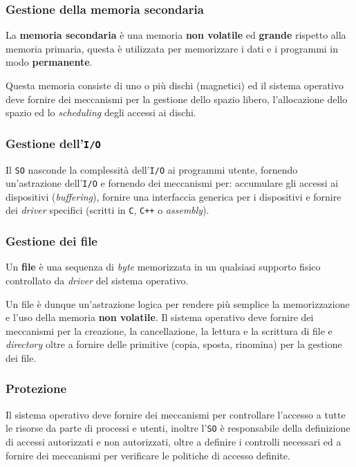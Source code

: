     \subsubsection{Gestione della memoria secondaria}
        \begin{definition}
            La \textbf{memoria secondaria} è una memoria \textbf{non volatile} ed \textbf{grande} rispetto alla memoria primaria, questa è utilizzata per memorizzare i dati e i programmi in modo \textbf{permanente}.
        \end{definition}
        Questa memoria consiste di uno o più dischi (magnetici) ed il sistema operativo deve fornire dei meccanismi per la gestione dello spazio libero, l'allocazione dello spazio ed lo \textit{scheduling} degli accessi ai dischi.

    \subsubsection{Gestione dell'\texttt{I/O}}
        Il \texttt{SO} nasconde la complessità dell'\texttt{I/O} ai programmi utente, fornendo un'astrazione dell'\texttt{I/O} e fornendo dei meccanismi per: accumulare gli accessi ai dispositivi (\textit{buffering}), fornire una interfaccia generica per i dispositivi e fornire dei \textit{driver} specifici (scritti in \texttt{C}, \texttt{C++} o \textit{assembly}). 

    \subsubsection{Gestione dei file}
        \begin{definition}[File]
            Un \textbf{file} è una sequenza di \textit{byte} memorizzata in un qualsiasi supporto fisico controllato da \textit{driver} del sistema operativo.
        \end{definition}
        Un file è dunque un'astrazione logica per rendere più semplice la memorizzazione e l'uso della memoria \textbf{non volatile}. Il sistema operativo deve fornire dei meccanismi per la creazione, la cancellazione, la lettura e la scrittura di file e \textit{directory} oltre a fornire delle primitive (copia, sposta, rinomina) per la gestione dei file. 

    \subsubsection{Protezione}
        Il sistema operativo deve fornire dei meccanismi per controllare l'accesso a tutte le risorse da parte di processi e utenti, inoltre l'\texttt{SO} è responsabile della definizione di accessi autorizzati e non autorizzati, oltre a definire i controlli necessari ed a fornire dei meccanismi per verificare le politiche di accesso definite.

